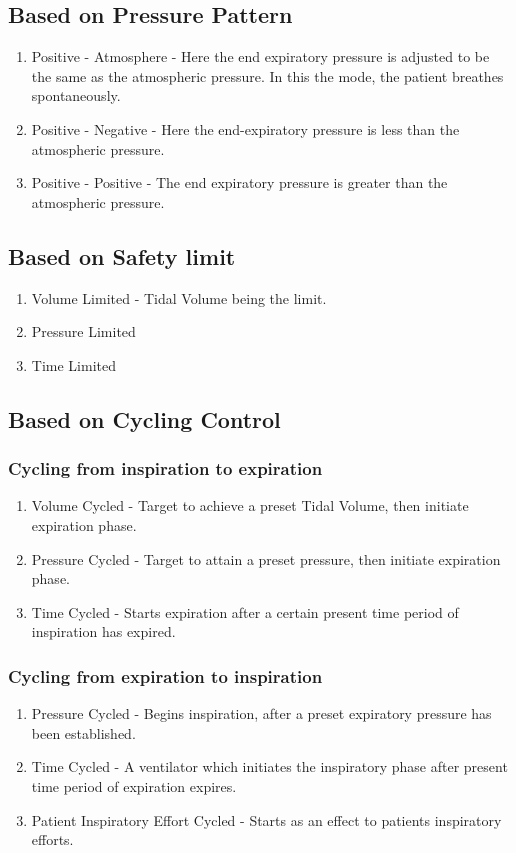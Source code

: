 \documentclass{article}
\begin{document}
\subsection{Based on Pressure Pattern}
\begin{enumerate}
    \item Positive - Atmosphere - Here the end expiratory pressure is adjusted to be the same as the atmospheric pressure. In this the mode, the patient breathes spontaneously.
    \item Positive - Negative - Here the end-expiratory pressure is less than the atmospheric pressure.
    \item Positive - Positive - The end expiratory pressure is greater than the atmospheric pressure.
\end{enumerate}
\subsection{Based on Safety limit}
\begin{enumerate}
    \item Volume Limited - Tidal Volume being the limit.
    \item Pressure Limited
    \item Time Limited
\end{enumerate}
\subsection{Based on Cycling Control}
\subsubsection{Cycling from inspiration to expiration}
\begin{enumerate}
    \item Volume Cycled - Target to achieve a preset Tidal Volume, then initiate expiration phase.
    \item Pressure Cycled - Target to attain a preset pressure, then initiate expiration phase.
    \item Time Cycled - Starts expiration after a certain present time period of inspiration has expired.
\end{enumerate}
\subsubsection{Cycling from expiration to inspiration}
\begin{enumerate}
    \item Pressure Cycled - Begins inspiration, after a preset expiratory pressure has been established.
    \item Time Cycled - A ventilator which initiates the inspiratory phase after present time period of expiration expires.
    \item Patient Inspiratory Effort Cycled - Starts as an effect to patients inspiratory efforts. 
\end{enumerate}
\end{document}
